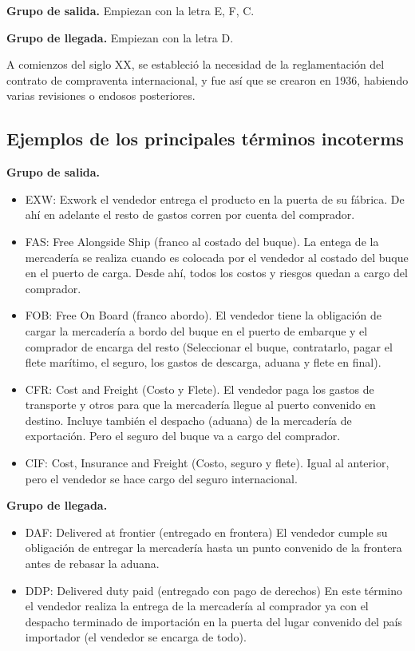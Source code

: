 \textbf{Grupo de salida.}
Empiezan con la letra E, F, C.

\textbf{Grupo de llegada.}
Empiezan con la letra D.

A comienzos del siglo XX,
se estableció la necesidad de la reglamentación del contrato de compraventa 
internacional,
y fue así que se crearon en 1936,
habiendo varias revisiones o endosos posteriores.

\subsection{Ejemplos de los principales términos incoterms}

\textbf{Grupo de salida.}
\begin{itemize}
      \item EXW: Exwork el vendedor entrega el producto en la puerta de su fábrica. 
      De ahí en adelante el resto de gastos corren por cuenta del comprador.
      \item FAS: Free Alongside Ship (franco al costado del buque).
      La entega de la mercadería se realiza cuando es colocada por el vendedor 
      al costado del buque en el puerto de carga. Desde ahí, todos los costos 
      y riesgos quedan a cargo del comprador.
      \item FOB: Free On Board (franco abordo).
      El vendedor tiene la obligación de cargar la mercadería a bordo del buque 
      en el puerto de embarque y el comprador de encarga del resto 
      (Seleccionar el buque, contratarlo, pagar el flete marítimo,
      el seguro, los gastos de descarga, aduana y flete en final).
      \item CFR: Cost and Freight (Costo y Flete).
      El vendedor paga los gastos de transporte y otros para que la mercadería 
      llegue al puerto convenido en destino. Incluye también el despacho 
      (aduana) de la mercadería de exportación. Pero el seguro del buque va a 
      cargo del comprador.
      \item CIF: Cost, Insurance and Freight (Costo, seguro y flete).
      Igual al anterior, pero el vendedor se hace cargo del seguro 
      internacional.
\end{itemize}

\textbf{Grupo de llegada.}
\begin{itemize}
      \item DAF: Delivered at frontier (entregado en frontera)
      El vendedor cumple su obligación de entregar la mercadería hasta un punto
      convenido de la frontera antes de rebasar la aduana.
      \item DDP: Delivered duty paid (entregado con pago de derechos)
      En este término el vendedor realiza la entrega de la mercadería al 
      comprador ya con el despacho terminado de importación en la puerta del 
      lugar convenido del país importador (el vendedor se encarga de todo).
\end{itemize}

